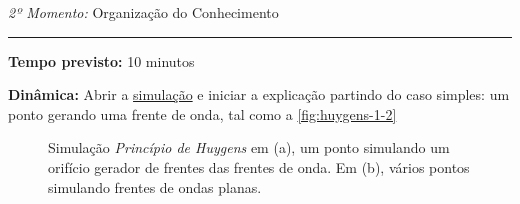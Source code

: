     \newpage
    \bigskip{}
    \noindent\emph{2º Momento:} Organização do Conhecimento
    \par\noindent\rule{.3\textwidth}{.5pt}  
    \par\noindent\textbf{Tempo previsto:} 10 minutos
    \smallskip
    \par\noindent\textbf{Dinâmica:} Abrir a \href{https://simphy.com/other-apps/huygen-principle/}{simulação} e iniciar a explicação partindo do caso simples: um ponto gerando uma frente de onda, tal como a \autoref{fig:huygens-1-2}

    \vspace*{10pt}
    \begin{figure}[!ht]        
        \centering              
        \hfill
        \caption{Simulação \emph{Princípio de Huygens} em (a), um ponto simulando um orifício gerador de frentes das frentes de onda. Em (b), vários pontos simulando frentes de ondas planas.}
        \label{fig:huygens-1-2}
    \end{figure}
    \vspace*{10pt}

